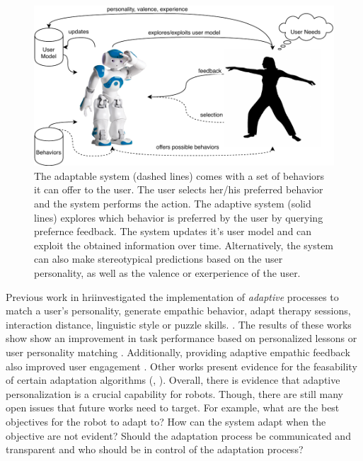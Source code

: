 \documentclass[twocolumn]{svjour3}          %
\begin{document}
\begin{figure}[h!]
\includegraphics[width=\columnwidth]{figures/figure-latex/adaptation.pdf}
\caption{The adaptable system (dashed lines) comes with a set of behaviors it can offer to the user. The user selects her/his preferred behavior and the system performs the action. The adaptive system (solid lines) explores which behavior is preferred by the user by querying prefernce feedback. The system updates it's user model and can exploit the obtained information over time. Alternatively, the system can also make stereotypical predictions based on the user personality, as well as the valence or exerperience of the user. } \label{fig:adaptation}
\end{figure}

Previous work in \gls{hri}investigated the implementation of \textit{adaptive}
processes to match a user's personality, generate empathic behavior,
adapt therapy sessions, interaction distance, linguistic style or puzzle skills.
\autocites{tapus2008user,leite2011modelling,Tsiakas2016,mitsunaga2008adapting,ritschel,leyzberg2014personalizing,hemminghaus2017towards}.
The results of these works show show an improvement in task performance based on personalized lessons or user personality matching \cite{tapus2008user, leyzberg2014personalizing,hemminghaus2017towards}. Additionally, providing adaptive empathic feedback also improved user engagement \cite{leite2011modelling}. Other works present evidence for the feasability of certain adaptation algorithms (\eg{}, \cite{mitsunaga2008adapting}). Overall, there is evidence that adaptive personalization is a crucial capability for robots. Though, there are still many open issues that future works need to target. For example, what are the best objectives for the robot to adapt to? How can the system adapt when the objective are not evident? Should the adaptation process be communicated and transparent and who should be in control of the adaptation process?
\end{document}
